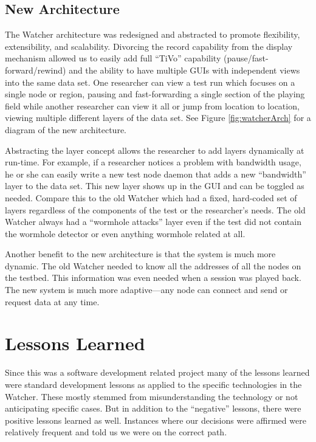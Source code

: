 \documentclass{report}
\begin{document}
\subsection{New Architecture}
\label{newArch}

The Watcher architecture was redesigned and abstracted to promote flexibility, extensibility, and scalability.  Divorcing the record 
capability from the display mechanism allowed us to easily add full ``TiVo'' capability (pause\slash fast-forward\slash rewind) and the ability to have multiple 
GUIs with independent views into the same data set. One researcher can view a test run which focuses on a single node or region, 
pausing and fast-forwarding a single section of the playing field while another researcher can view it all or jump from 
location to location, viewing multiple different layers of the data set. See Figure \ref{fig:watcherArch} for a diagram 
of the new architecture.

Abstracting the layer concept allows the researcher to add layers dynamically at run-time. For example, 
if a researcher notices a problem with bandwidth usage, he or she can easily write a new test node daemon that 
adds a new ``bandwidth'' layer to the data set. This new layer shows up in the GUI and can be toggled as needed. 
Compare this to the old Watcher which had a fixed, hard-coded set of layers regardless of the components of the test
or the researcher's needs. The old Watcher always had a ``wormhole attacks'' layer even if the test did not 
contain the wormhole detector or even anything wormhole related at all. 

Another benefit to the new architecture is that the system is much more dynamic. The old Watcher needed to know all the addresses of all the nodes
on the testbed. This information was even needed when a session was played back. The new system is much more adaptive---any node can connect and 
send or request data at any time. 

\section{Lessons Learned}
Since this was a software development related project many of the lessons learned were standard development lessons as applied to the 
specific technologies in the Watcher. These mostly stemmed from misunderstanding the technology or not anticipating specific cases. 
But in addition to the ``negative'' lessons, there were positive lessons learned as well. Instances where our decisions were affirmed were
relatively frequent and told us we were on the correct path. 
\end{document}
